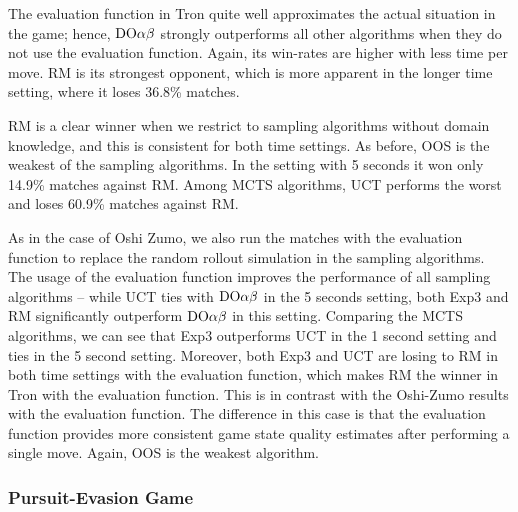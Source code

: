 The evaluation function in Tron quite well approximates the actual situation in the game; hence, $\textrm{DO}\alpha\beta$ strongly outperforms all other algorithms when they do not use the evaluation function. Again, its win-rates are higher with less time per move. RM is its strongest opponent, which is more apparent in the longer time setting, where it loses 36.8\% matches.

RM is a clear winner when we restrict to sampling algorithms without domain knowledge, and this is consistent for both time settings. 
As before, OOS is the weakest of the sampling algorithms. In the setting with 5 seconds it won only 14.9\% matches against RM. 
Among MCTS algorithms, UCT performs the worst and loses 60.9\% matches against RM.

As in the case of Oshi Zumo, we also run the matches with the evaluation function to replace the random rollout simulation in the sampling algorithms. 
The usage of the evaluation function improves the performance of all sampling algorithms -- while UCT ties with $\textrm{DO}\alpha\beta$ in the 5 seconds setting, both Exp3 and RM significantly outperform $\textrm{DO}\alpha\beta$ in this setting.
Comparing the MCTS algorithms, we can see that Exp3 outperforms UCT in the 1 second setting and ties in the 5 second setting.
Moreover, both Exp3 and UCT are losing to RM in both time settings with the evaluation function, which makes RM the winner in Tron with the evaluation function.
This is in contrast with the Oshi-Zumo results with the evaluation function.
The difference in this case is that the evaluation function provides more consistent game state quality estimates after performing a single move.
Again, OOS is the weakest algorithm.

\subsubsection{Pursuit-Evasion Game}

